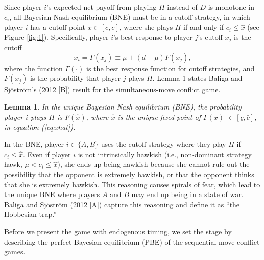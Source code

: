 \documentclass[12pt,english]{article}
\begin{document}
Since player $i$'s expected net payoff from playing $H$ instead of $D$ is monotone in $c_i$, all Bayesian Nash equilibrium (BNE) must be in a cutoff strategy, in which player $i$ has a cutoff point $x \in [\underline{c}, \bar{c}]$, where she plays $H$ if and only if $c_i \leq \hat{x}$ (see Figure \ref{fig:1}). Specifically, player $i$'s best response to player $j$'s cutoff $x_j$ is the cutoff
\begin{equation}
    x_i=\Gamma(x_j)\equiv \mu+(d-\mu)F(x_j),
    \label{eq:xhat}
\end{equation}
\noindent where the function $\Gamma(\cdot)$ is the best response function for cutoff strategies, and $F(x_j)$ is the probability that player $j$ plays $H$. Lemma 1 states Baliga and Sj\"ostr\"om's (2012 [B]) result for the simultaneous-move conflict game.
\newtheorem{lem}{Lemma}
\begin{lem}
In the unique Bayesian Nash equilibrium (BNE), the probability player $i$ plays $H$ is $F(\hat{x})$, where $\hat{x}$ is the unique fixed point of $\Gamma(x)$  $ \in [\underline{c}, \bar{c}]$, in equation (\ref{eq:xhat}).
\end{lem}\par
In the BNE, player $i \in \{A,B\}$ uses the cutoff strategy where they play $H$ if $c_i \leq \hat{x}$. Even if player $i$ is not intrinsically hawkish (i.e., non-dominant strategy hawk, $\mu<c_i \leq \hat{x}$), she ends up being hawkish because she cannot rule out the possibility that the opponent is extremely hawkish, or that the opponent thinks that she is extremely hawkish. This reasoning causes spirals of fear, which lead to the unique BNE where players $A$ and $B$ may end up being in a state of war. Baliga and Sj\"ostr\"om (2012 [A]) capture this reasoning and define it as ``the Hobbesian trap.''\par
Before we present the game with endogenous timing, we set the stage by describing the perfect Bayesian equilibrium (PBE) of the sequential-move conflict games. 
\end{document}
